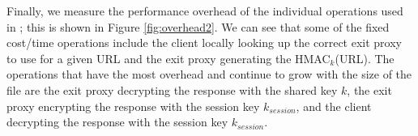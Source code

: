 
Finally, we measure the performance overhead of the individual operations used in
\system{}; this is shown in Figure \ref{fig:overhead2}. %
We can see that some of the fixed cost/time 
operations include the client locally looking up the correct exit proxy to use for a given URL and the exit proxy generating the 
HMAC$_{k}$(URL).  The operations that have the most overhead and continue to grow with the size of the file are the exit proxy decrypting 
the response with the shared key $k$, the exit proxy encrypting the response with the session key $k_{session}$, and the client 
decrypting the response with the session key $k_{session}$.


%
%
